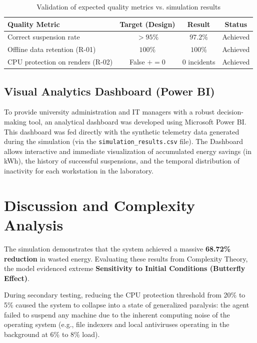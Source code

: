 \documentclass[12pt,a4paper]{article}
\begin{document}
\begin{table}[H]
\centering
\caption{Validation of expected quality metrics vs. simulation results}
\label{tab:quality_validation}
\begin{tabular}{|p{5.5cm}|c|c|c|}
\hline
\textbf{Quality Metric} & \textbf{Target (Design)} & \textbf{Result} & \textbf{Status} \\
\hline
Correct suspension rate & $>95\%$ & $97.2\%$ & Achieved \\
\hline
Offline data retention (R-01) & $100\%$ & $100\%$ & Achieved \\
\hline
CPU protection on renders (R-02) & False $+ = 0$ & 0 incidents & Achieved \\
\hline
\end{tabular}
\end{table}

\subsection{Visual Analytics Dashboard (Power BI)}
To provide university administration and IT managers with a robust decision-making tool, an analytical dashboard was developed using Microsoft Power BI. This dashboard was fed directly with the synthetic telemetry data generated during the simulation (via the \texttt{simulation\_results.csv} file). The Dashboard allows interactive and immediate visualization of accumulated energy savings (in kWh), the history of successful suspensions, and the temporal distribution of inactivity for each workstation in the laboratory.

\section{Discussion and Complexity Analysis}

The simulation demonstrates that the system achieved a massive \textbf{68.72\% reduction} in wasted energy. Evaluating these results from Complexity Theory, the model evidenced extreme \textbf{Sensitivity to Initial Conditions (Butterfly Effect)}. 

During secondary testing, reducing the CPU protection threshold from 20\% to 5\% caused the system to collapse into a state of generalized paralysis: the agent failed to suspend any machine due to the inherent computing noise of the operating system (e.g., file indexers and local antiviruses operating in the background at 6\% to 8\% load). 
\end{document}
